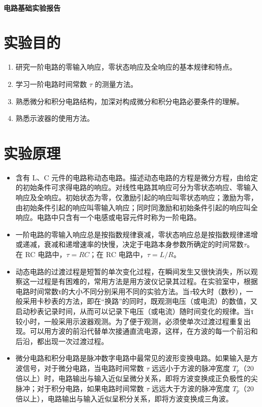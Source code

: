 \documentclass[a4paper,utf8]{article}
\begin{document}
\begin{center}
    {\mbox{}\\[7em]\bfseries\songti%
    电路基础实验报告}\\[34mm]
\end{center}
\newpage

\section{实验目的}
\begin{enumerate}
    \item 研究一阶电路的零输入响应，零状态响应及全响应的基本规律和特点。
    \item 学习一阶电路时间常数 $\tau$ 的测量方法。
    \item 熟悉微分和积分电路结构，加深对构成微分和积分电路必要条件的理解。
    \item 熟悉示波器的使用方法。
\end{enumerate}

\section{实验原理}%
\begin{itemize}
    \item 含有 L、C 元件的电路称动态电路。描述动态电路的方程是微分方程，由给定的初始条件可求得电路的响应。对线性电路其响应可分为零状态响应、零输入响应及全响应。初始状态为零，仅激励引起的响应叫零状态响应；激励为零，由初始条件引起的响应叫零输入响应；同时同激励和初始条件引起的响应叫全响应。电路中只含有一个电感或电容元件时称为一阶电路。
    \item 一阶电路的零输入响应总是按指数规律衰减，零状态响应总是按指数规律递增或递减，衰减和递增速率的快慢，决定于电路本身参数所确定的时间常数$\tau$。在 RC 电路中，$\tau=RC$；在 RC 电路中，$\tau=L/R$。
    \item 动态电路的过渡过程是短暂的单次变化过程，在瞬间发生又很快消失，所以观察这一过程是有困难的，常用方法是用方波仪记录其过程。在实验室中，根据电路时间常数τ的大小不同分别采用不同的实验方法。当$\tau$较大时（数秒），一般采用卡秒表的方法，即在“换路”的同时，既观测电压（或电流）的数值，又启动秒表记录时间，从而可以记录下电压（或电流）随时间变化的规律。当τ较小时，一般采用示波器观测。为了便于观测，必须使单次过渡过程重复出现。可以用方波的前沿代替单次接通直流电源，这样，在方波的每一个前沿和后沿，都出现一次过渡过程。
    \item 微分电路和积分电路是脉冲数字电路中最常见的波形变换电路。如果输入是方波信号，对于微分电路，当电路时间常数 $\tau$ 远远小于方波的脉冲宽度 $T_p$（20 倍以上）时，电路输出与输入近似呈微分关系，即将方波变换成正负极性的尖脉冲；对于积分电路，如果电路时间常数 $\tau$ 远远大于方波的脉冲宽度 $T_p$（20 倍以上），电路输出与输入近似呈积分关系，即将方波变换成三角波。
\end{itemize}
\end{document}
